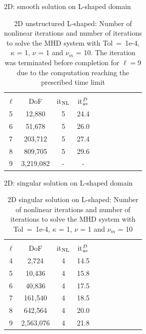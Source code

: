 \documentclass[12pt]{beamer}
\begin{document}
\begin{frame}{2D: smooth solution on L-shaped domain}
\begin{table}
\centering
\begin{tabular}{ccccccccccc}
\hline
\hline\\[-0.35cm]
  $\ell$ & DoF &  it$_{\rm NL}$ &  it$_{\rm av}^{\mbox \footnotesize D}$ \\[0.05cm]
\hline
\hline
 5 &   12,880 & 5 & 24.4 \\
 6 &   51,678 & 5  & 26.0 \\
 7 &  203,712 & 5  & 27.4 \\
 8 &  809,705 & 5  & 29.6 \\
9 &  3,219,082 & -  & - \\
\hline
\end{tabular}
\caption{2D unstructured L-shaped: Number of nonlinear iterations and number of iterations to solve the MHD system with Tol~=~1e-4, $\kappa$ = 1, $\nu$ = 1 and $\nu_m$ = 10. The iteration was terminated before completion for $\ell=9$ due to the computation reaching the prescribed time limit}
\label{tab:2DsmoothLshape}
\end{table}

\end{frame}

\begin{frame}{2D: singular solution on L-shaped domain}

\begin{table}
\centering
\begin{tabular}{ccccccccccc}
\hline
\hline\\[-0.35cm]
  $\ell$ & DoF &  it$_{\rm NL}$ &  it$_{\rm av}^{\mbox \footnotesize D}$ \\[0.05cm]
\hline
\hline
 4 &    2,724 & 4 &         14.5\\
 5 &   10,436 & 4 &         15.8\\
 6 &   40,836 & 4 &         17.5\\
 7 &  161,540 & 4 &         18.5\\
 8 &  642,564 & 4 &         20.0\\
 9 &2,563,076 & 4 &         21.8\\

\hline
\end{tabular}
\caption{2D singular solution on L-shaped: Number of nonlinear iterations and number of iterations to solve the MHD system with Tol~=~1e-4, $\kappa$ = 1, $\nu$ = 1 and $\nu_m$ = 10}
\label{tab:2DLshape}
\end{table}





\end{frame}
\end{document}
